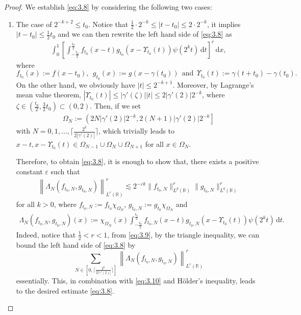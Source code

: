 \documentclass[11pt, twoside, leqno]{article}
\theoremstyle{definition}
\numberwithin{equation}{section}
\begin{document}
\begin{proof}
We establish \eqref{eq:3.8} by considering the following two cases:
\begin{enumerate}
  \item[$\bullet$] The case of $2^{-k+2}\leq t_0$. Notice that ${\frac{1}{2}}\cdot2^{-k}\leq|t-t_0|\leq2\cdot2^{-k}$, it implies $|t-t_0|\leq{\frac{1}{2}}t_0$ and we can then rewrite the left hand side of \eqref{eq:3.8} as
\begin{align}\label{eq:3.9}
\int_{0}^{1}\left[\int_{-\frac{t_0}{2}}^{\frac{t_0}{2}}f_{t_0}(x-t)g_{t_0}\left(x-\Upsilon_{t_0}(t)\right)\psi\left(2^{k}t\right)\,\textrm{d}t\right]^r\,\textrm{d}x,
\end{align}
where $$f_{t_0}(x):=f(x-t_0), ~~g_{t_0}(x):=g(x-\gamma(t_0))~~ \textrm{and} ~~\Upsilon_{t_0}(t):=\gamma(t+t_{0})-\gamma(t_{0}).$$ On the other hand, we obviously have $|t|\leq 2^{-k+1}$. Moreover, by Lagrange's mean value theorem, $|\Upsilon_{t_0}(t)|\leq |\gamma'(\zeta)||t|\leq 2|\gamma'(2)|2^{-k}$, where $\zeta\in({\frac{t_0}{2}},{\frac{3}{2}}t_0)\subset(0,2)$. Then, if we set
\begin{align*}
\Omega_{N}:=\left(2N|\gamma'(2)|2^{-k}, 2(N+1)|\gamma'(2)|2^{-k}\right]
\end{align*}
with $N=0,1,\ldots,\lceil\frac{2^k}{2|\gamma'(2)|}\rceil$, which trivially leads to $x-t, x-\Upsilon_{t_0}(t)\in \Omega_{N-1}\cup \Omega_{N} \cup \Omega_{N+1}$ for all $x\in \Omega_{N}$.

\quad Therefore, to obtain \eqref{eq:3.8}, it is enough to show that, there exists a positive constant $\varepsilon$ such that
\begin{align}\label{eq:3.10}
\left\|\Lambda_N(f_{t_0, N}, g_{t_0, N})\right\|_{L^{r}(\mathbb{R})}^{r}\lesssim 2^{-\varepsilon k}\|f_{t_0, N}\|_{L^{p}(\mathbb{R})}^{r}\|g_{t_0, N}\|_{L^{q}(\mathbb{R})}^{r}
\end{align}
for all $k>0$, where $f_{t_0, N}:=f_{t_0}\chi_{\Omega_{N}}$, $g_{t_0, N}:=g_{t_0}\chi_{\Omega_{N}}$ and
\begin{align*}
\Lambda_N(f_{t_0, N}, g_{t_0, N})(x):=\chi_{\Omega_{N}}(x)\int_{-\frac{t_0}{2}}^{\frac{t_0}{2}}f_{t_0, N}(x-t)g_{t_0, N}\left(x-\Upsilon_{t_0}(t)\right)\psi\left(2^{k}t\right)\,\textrm{d}t.
\end{align*}
Indeed, notice that $\frac{1}{2}<r<1$, from \eqref{eq:3.9}, by the triangle inequality, we can bound the left hand side of \eqref{eq:3.8} by $$\sum_{N\in [0, \lceil\frac{2^k}{2|\gamma'(2)|}\rceil]} \left\|\Lambda_N(f_{t_0, N}, g_{t_0, N})\right\|_{L^{r}(\mathbb{R})}^{r}$$ essentially. This, in combination with \eqref{eq:3.10} and H\"{o}lder's inequality, leads to the desired estimate \eqref{eq:3.8}.


\end{enumerate}
\end{proof}
\end{document}
